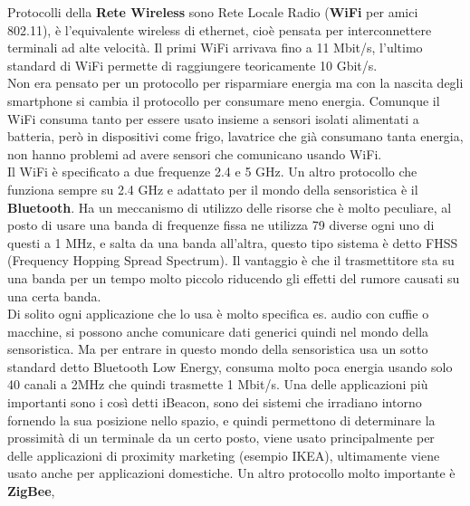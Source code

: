 \documentclass[11pt, twocolumn]{article}
\begin{document}
Protocolli della \textbf{Rete Wireless} sono Rete Locale Radio (\textbf{WiFi} per amici 802.11), è l'equivalente wireless di ethernet, cioè pensata per interconnettere terminali ad alte velocità.
Il primi WiFi arrivava fino a 11 Mbit/s, l'ultimo standard di WiFi permette di raggiungere teoricamente 10 Gbit/s.\\
Non era pensato per un protocollo per risparmiare energia ma con la nascita degli smartphone si cambia il protocollo per consumare meno energia.
Comunque il WiFi consuma tanto per essere usato insieme a sensori isolati alimentati a batteria, però in dispositivi come frigo, lavatrice che già consumano tanta energia, non hanno problemi ad avere sensori che comunicano usando WiFi.\\
Il WiFi è specificato a due frequenze 2.4 e 5 GHz.
Un altro protocollo che funziona sempre su 2.4 GHz e adattato per il mondo della sensoristica è il \textbf{Bluetooth}.
Ha un meccanismo di utilizzo delle risorse che è molto peculiare, al posto di usare una banda di frequenze fissa ne utilizza 79 diverse ogni uno di questi a 1 MHz, e salta da una banda all'altra, questo tipo sistema è detto FHSS (Frequency Hopping Spread Spectrum).
Il vantaggio è che il trasmettitore sta su una banda per un tempo molto piccolo riducendo gli effetti del rumore causati su una certa banda.\\
Di solito ogni applicazione che lo usa è molto specifica es. audio con cuffie o macchine, si possono anche comunicare dati generici quindi nel mondo della sensoristica.
Ma per entrare in questo mondo della sensoristica usa un sotto standard detto Bluetooth Low Energy, consuma molto poca energia usando solo 40 canali a 2MHz che quindi trasmette 1 Mbit/s.
Una delle applicazioni più importanti sono i così detti iBeacon, sono dei sistemi che irradiano intorno fornendo la sua posizione nello spazio, e quindi permettono di determinare la prossimità di un terminale da un certo posto, viene usato principalmente per delle applicazioni di proximity marketing (esempio IKEA), ultimamente viene usato anche per applicazioni domestiche.
Un altro protocollo molto importante è \textbf{ZigBee}, 
\end{document}
